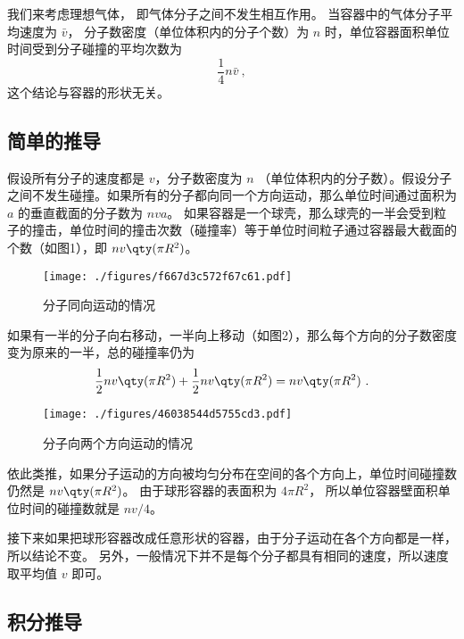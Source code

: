 

我们来考虑理想气体， 即气体分子之间不发生相互作用。 当容器中的气体分子平均速度为 $\bar v$， 分子数密度（单位体积内的分子个数）为 $n$ 时，单位容器面积单位时间受到分子碰撞的平均次数为
\begin{equation}
\frac14 n\bar v~,
\end{equation}
这个结论与容器的形状无关。

\subsection{简单的推导}

假设所有分子的速度都是 $v$，分子数密度为 $n$ （单位体积内的分子数）。假设分子之间不发生碰撞。如果所有的分子都向同一个方向运动，那么单位时间通过面积为 $a$ 的垂直截面的分子数为 $nva$。 如果容器是一个球壳，那么球壳的一半会受到粒子的撞击，单位时间的撞击次数（碰撞率）等于单位时间粒子通过容器最大截面的个数（如图1），即 $nv \qty(\pi R^2)$。 
\begin{figure}[ht]
\centering
\texttt{[image: ./figures/f667d3c572f67c61.pdf]}
\caption{分子同向运动的情况} \label{fig_AvgHit_1}
\end{figure}
如果有一半的分子向右移动，一半向上移动（如图2），那么每个方向的分子数密度变为原来的一半，总的碰撞率仍为
\begin{equation}
\frac12 nv \qty(\pi R^2) + \frac12 nv \qty(\pi R^2) = nv \qty(\pi R^2)~.
\end{equation}


\begin{figure}[ht]
\centering
\texttt{[image: ./figures/46038544d5755cd3.pdf]}
\caption{分子向两个方向运动的情况} \label{fig_AvgHit_2}
\end{figure}
依此类推，如果分子运动的方向被均匀分布在空间的各个方向上，单位时间碰撞数仍然是 $nv \qty(\pi R^2)$。
由于球形容器的表面积为 $4\pi R^2$， 所以单位容器壁面积单位时间的碰撞数就是 $nv/4$。 

接下来如果把球形容器改成任意形状的容器，由于分子运动在各个方向都是一样，所以结论不变。 另外，一般情况下并不是每个分子都具有相同的速度，所以速度取平均值 $v$ 即可。

\subsection{积分推导}

